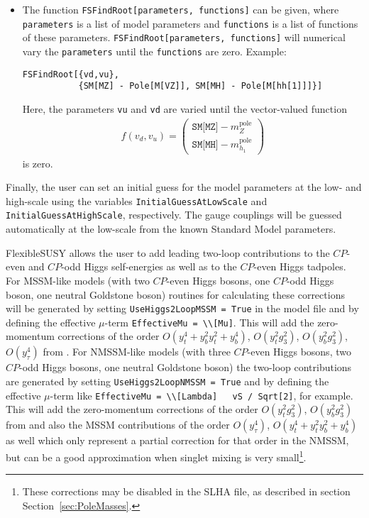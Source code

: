 \documentclass[final,3p,11pt,pdflatex]{elsarticle}
\makeatletter
\newcommand{\fs}{FlexibleSUSY\@\xspace}
\newcommand{\code}[1]{\lstinline|#1|}  %
\newcommand{\pole}{\text{pole}}
\newcommand{\secref}[1]{Section~\ref{#1}}
\makeatother
\begin{document}
\begin{itemize}
\item The function \code{FSFindRoot[parameters, functions]} can be
  given, where \code{parameters} is a list of model parameters and
  \code{functions} is a list of functions of these parameters.
  \code{FSFindRoot[parameters, functions]} will numerical vary the
  \code{parameters} until the \code{functions} are zero.  Example:
  \begin{lstlisting}
FSFindRoot[{vd,vu},
           {SM[MZ] - Pole[M[VZ]], SM[MH] - Pole[M[hh[1]]]}]
  \end{lstlisting}
  Here, the parameters \code{vu} and \code{vd} are varied until the
  vector-valued function
  \begin{align}
    f(v_d,v_u) =
    \begin{pmatrix}
      \texttt{SM[MZ]} - m_Z^\pole \\
      \texttt{SM[MH]} - m_{h_1}^\pole
    \end{pmatrix}
  \end{align}
  is zero.
\end{itemize}
%
Finally, the user can set an initial guess for the model parameters at
the low- and high-scale using the variables
\code{InitialGuessAtLowScale} and \code{InitialGuessAtHighScale},
respectively.  The gauge couplings will be guessed automatically at
the low-scale from the known Standard Model parameters.

\fs allows the user to add leading two-loop contributions to the
$CP$-even and $CP$-odd Higgs self-energies as well as to the $CP$-even Higgs
tadpoles.  For MSSM-like models (with two $CP$-even Higgs bosons, one
$CP$-odd Higgs boson, one neutral Goldstone boson) routines for
calculating these corrections will be generated by setting
\code{UseHiggs2LoopMSSM = True} in the model file and by defining the
effective $\mu$-term \code{EffectiveMu = \\[Mu]}.  This will add the
zero-momentum corrections of the order $O(y_t^4 + y_b^2 y_t^2 +
y_b^4)$, $O(y_t^2 g_3^2)$, $O(y_b^2 g_3^2)$, $O(y_\tau^4)$ from
\cite{Degrassi:2001yf,Brignole:2001jy,Dedes:2002dy,Brignole:2002bz,Dedes:2003km}.
For NMSSM-like models (with three $CP$-even Higgs bosons, two $CP$-odd
Higgs bosons, one neutral Goldstone boson) the two-loop contributions
are generated by setting \code{UseHiggs2LoopNMSSM = True} and by
defining the effective $\mu$-term like \code{EffectiveMu = \\[Lambda]
  vS / Sqrt[2]}, for example.  This will add the zero-momentum
corrections of the order $O(y_t^2 g_3^2)$, $O(y_b^2 g_3^2)$ from
\cite{Degrassi:2009yq} and also the MSSM contributions of the order
$O(y_\tau^4)$, $O(y_t^4 + y_t^2 y_b^2 + y_b^4)$ as well
\cite{Brignole:2001jy,Dedes:2003km} which only represent a partial
correction for that order in the NMSSM, but can be a good
approximation when singlet mixing is very small\footnote{These
  corrections may be disabled in the SLHA file, as described in
  section \secref{sec:PoleMasses}.}.
\end{document}
